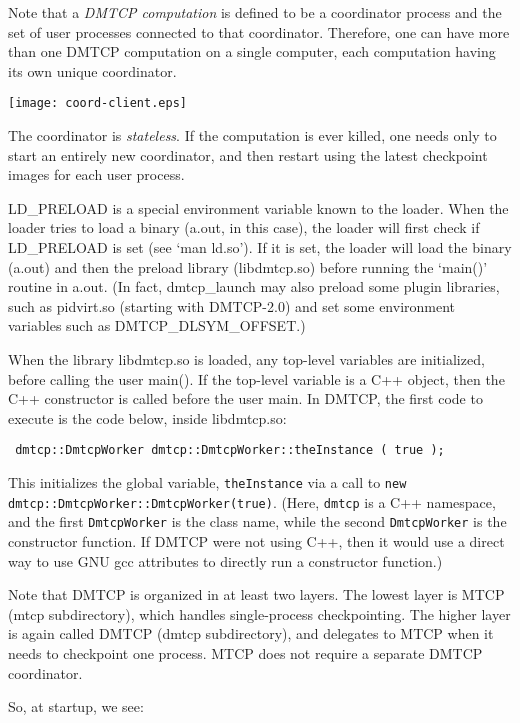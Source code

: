 \documentclass{article}
\begin{document}
Note that a {\em DMTCP computation} is defined to be a coordinator process
and the set of user processes connected to that coordinator.  Therefore,
one can have more than one DMTCP computation on a single computer,
each computation having its own unique coordinator.

\begin{center}
\texttt{[image: coord-client.eps]}
\end{center}

The coordinator is {\em stateless}.  If the computation is ever killed,
one needs only to start an entirely new coordinator, and then restart
using the latest checkpoint images for each user process.

LD\_PRELOAD is a special environment variable known to the loader.
When the loader tries to load a binary (a.out, in this case), the loader
will first check if LD\_PRELOAD is set (see `man ld.so').  If it is
set, the loader will load the binary (a.out) and then the preload library
(libdmtcp.so) before running the `main()' routine in a.out.
(In fact, dmtcp\_launch may also preload some plugin libraries,
 such as pidvirt.so (starting with DMTCP-2.0) and set some
 environment variables such as DMTCP\_DLSYM\_OFFSET.)

When the library libdmtcp.so is loaded, any top-level variables
are initialized, before calling the user main().  If the top-level variable
is a C++ object, then the C++ constructor is called before the
user main.  In DMTCP, the first code to execute is the code
below, inside libdmtcp.so:

{\tt
dmtcp::DmtcpWorker dmtcp::DmtcpWorker::theInstance ( true );
}

This initializes the global variable, {\tt theInstance} via a call
to {\tt new dmtcp::DmtcpWorker::DmtcpWorker(true)}.  (Here, {\tt dmtcp}
is a C++ namespace, and the first {\tt DmtcpWorker} is the class name,
while the second {\tt DmtcpWorker} is the constructor function.  If DMTCP were
not using C++, then it would use a direct way to use GNU gcc attributes
to directly run a constructor function.)

Note that DMTCP is organized in at least two layers.  The lowest layer
is MTCP (mtcp subdirectory), which handles single-process checkpointing.
The higher layer is again called DMTCP (dmtcp subdirectory), and delegates
to MTCP when it needs to checkpoint one process.  MTCP does not require
a separate DMTCP coordinator.

So, at startup, we see:
\end{document}
